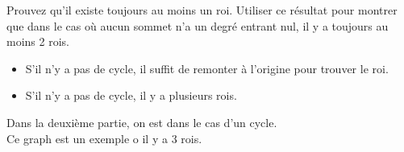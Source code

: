 Prouvez qu'il existe toujours au moins un roi.
Utiliser ce résultat pour montrer que dans le cas où aucun sommet n'a un degré entrant nul, il y a toujours au moins 2 rois.
\begin{solution}
\begin{itemize}
\item S'il n'y a pas de cycle, il suffit de remonter à l'origine pour trouver le roi.
\item S'il n'y a pas de cycle, il y a plusieurs rois. 
\end{itemize}

Dans la deuxième partie, on est dans le cas d'un cycle.\\Ce graph est un exemple o il y a 3 rois.

\end{solution}

